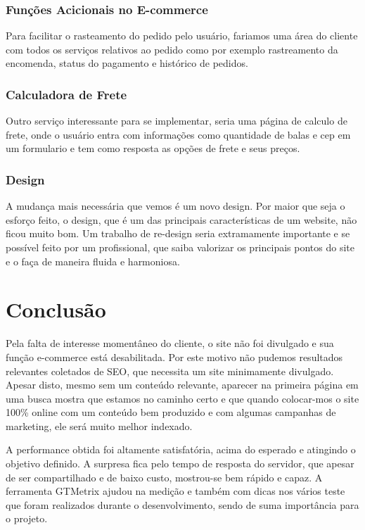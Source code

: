 \documentclass[
	12pt,				%
    oneside,			%
	a4paper,			%
	english,			%
	french,				%
	spanish,			%
	brazil				%
	]{abntex2}
\begin{document}
\subsection{Funções Acicionais no E-commerce}
Para facilitar o rasteamento do pedido pelo usuário, fariamos uma área do cliente com todos os serviços relativos ao pedido como por exemplo rastreamento da encomenda, status do pagamento e histórico de pedidos.

\subsection{Calculadora de Frete}
Outro serviço interessante para se implementar, seria uma página de calculo de frete, onde o usuário entra com informações como quantidade de balas e cep em um formulario e tem como resposta as opções de frete e seus preços.

\subsection{Design}
A mudança mais necessária que vemos é um novo design. Por maior que seja o esforço feito, o design, que é um das principais características de um website, não ficou muito bom. Um trabalho de re-design seria extramamente importante e se possível feito por um profissional, que saiba valorizar os principais pontos do site e o faça de maneira fluida e harmoniosa.

\chapter{Conclusão}

Pela falta de interesse momentâneo do cliente, o site não foi divulgado e sua função e-commerce está desabilitada. Por este motivo não pudemos resultados relevantes coletados de SEO, que necessita um site minimamente divulgado. Apesar disto, mesmo sem um conteúdo relevante, aparecer na primeira página em uma busca mostra que estamos no caminho certo e que quando colocar-mos o site 100\% online com um conteúdo bem produzido e com algumas campanhas de marketing, ele será muito melhor indexado.

A performance obtida foi altamente satisfatória, acima do esperado e atingindo o objetivo definido. A surpresa fica pelo tempo de resposta do servidor, que apesar de ser compartilhado e de baixo custo, mostrou-se bem rápido e capaz. A ferramenta GTMetrix ajudou na medição e também com dicas nos vários teste que foram realizados durante o desenvolvimento, sendo de suma importância para o projeto.
\end{document}
